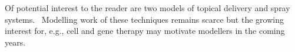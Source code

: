 \documentclass[12pt,a4paper]{journal}
\begin{document}
Of potential interest to the reader are two models of topical delivery and spray systems.~\cite{Mori_2017,Nweze_2020}
Modelling work of these techniques remains scarce but the growing interest for, e.g., cell and gene therapy may motivate modellers in the coming years.



\end{document}
